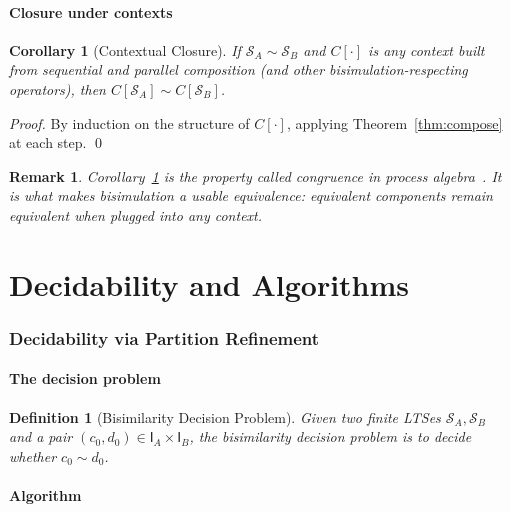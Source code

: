 \documentclass[twocolumn,11pt,a4paper]{article}
\newtheorem{corollary}[theorem]{Corollary}
\newtheorem{definition}[theorem]{Definition}
\newtheorem{remark}[theorem]{Remark}
\newcommand{\Init}{\mathsf{I}}
\newcommand{\Sys}{\mathcal{S}}
\newcommand{\bisim}{\sim}
\begin{document}
\subsection{Closure under contexts}

\begin{corollary}[Contextual Closure]
\label{cor:context}
If $\Sys_A \bisim \Sys_B$ and $C[\cdot]$ is any context built from sequential and parallel composition (and other bisimulation-respecting operators), then $C[\Sys_A] \bisim C[\Sys_B]$.
\end{corollary}

\begin{proof}
By induction on the structure of $C[\cdot]$, applying Theorem~\ref{thm:compose} at each step. \qed
\end{proof}

\begin{remark}
Corollary~\ref{cor:context} is the property called \emph{congruence} in process algebra~\citep{milner1989}. It is what makes bisimulation a usable equivalence: equivalent components remain equivalent when plugged into any context.
\end{remark}

\part{Decidability and Algorithms}

\section{Decidability via Partition Refinement}
\label{sec:decidability}

\subsection{The decision problem}

\begin{definition}[Bisimilarity Decision Problem]
\label{def:bisim-problem}
Given two finite LTSes $\Sys_A, \Sys_B$ and a pair $(c_0, d_0) \in \Init_A \times \Init_B$, the \emph{bisimilarity decision problem} is to decide whether $c_0 \bisim d_0$.
\end{definition}

\subsection{Algorithm}
\end{document}
